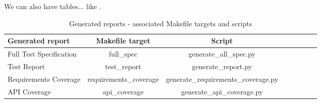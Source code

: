 We can also have tables... like .

\begin{center}
\begin{table}[htb]
  \caption{Generated reports - associated Makefile targets and scripts}
  \begin{tabular}{l*{6}{c}r}
    Generated report & Makefile target & Script \\
    \hline
    Full Test Specification & full_spec & generate_all_spec.py  \\
    Test Report & test_report & generate_report.py  \\
    Requirements Coverage & requirements_coverage &
    generate_requirements_coverage.py   \\
    API Coverage & api_coverage & generate_api_coverage.py  \\
  \end{tabular}
  \label{table:reports}
\end{table}
\end{center}
